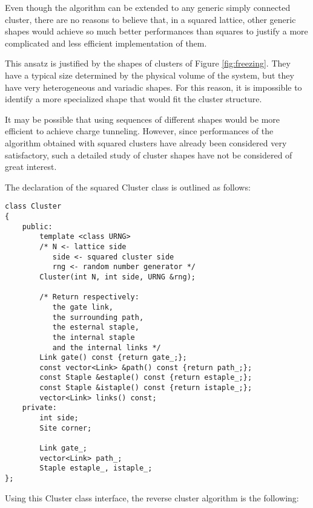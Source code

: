 Even though the algorithm can be extended to any generic simply connected cluster,
there are no reasons to believe that, in a squared lattice,
other generic shapes would achieve so much better performances than squares
to justify a more complicated and less efficient implementation of them.

This ansatz is justified by the shapes of clusters of Figure \ref{fig:freezing}.
They have a typical size determined by the physical volume of the system,
but they have very heterogeneous and variadic shapes. 
For this reason,
it is impossible to identify a more specialized shape that would fit the cluster structure.

It may be possible that using sequences of different shapes would be more efficient to achieve charge tunneling.
However, since performances of the algorithm obtained with squared clusters have already been considered very satisfactory,
such a detailed study of cluster shapes have not be considered of great interest.

The declaration of the squared {\ttfamily Cluster} class is outlined as follows:

\begin{lstlisting}[caption={Cluster class declaration}]
class Cluster
{
    public:
        template <class URNG>
        /* N <- lattice side
           side <- squared cluster side
           rng <- random number generator */
        Cluster(int N, int side, URNG &rng);

        /* Return respectively:
           the gate link,
           the surrounding path,
           the esternal staple,
           the internal staple
           and the internal links */
        Link gate() const {return gate_;};
        const vector<Link> &path() const {return path_;};
        const Staple &estaple() const {return estaple_;};
        const Staple &istaple() const {return istaple_;};
        vector<Link> links() const;
    private:
        int side;
        Site corner;

        Link gate_;
        vector<Link> path_;
        Staple estaple_, istaple_;
};
\end{lstlisting}

Using this {\ttfamily Cluster} class interface, the reverse cluster algorithm is the following:

